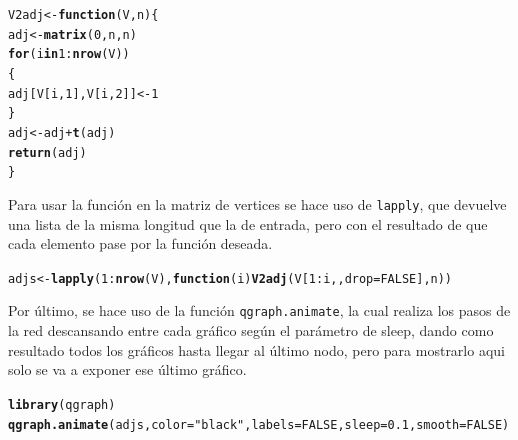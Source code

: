 \documentclass{article}\usepackage[]{graphicx}\usepackage[]{color}
\makeatletter
\newcommand{\hlnum}[1]{\textcolor[rgb]{0.686,0.059,0.569}{#1}}%
\newcommand{\hlstr}[1]{\textcolor[rgb]{0.192,0.494,0.8}{#1}}%
\newcommand{\hlopt}[1]{\textcolor[rgb]{0,0,0}{#1}}%
\newcommand{\hlstd}[1]{\textcolor[rgb]{0.345,0.345,0.345}{#1}}%
\newcommand{\hlkwa}[1]{\textcolor[rgb]{0.161,0.373,0.58}{\textbf{#1}}}%
\newcommand{\hlkwb}[1]{\textcolor[rgb]{0.69,0.353,0.396}{#1}}%
\newcommand{\hlkwc}[1]{\textcolor[rgb]{0.333,0.667,0.333}{#1}}%
\newcommand{\hlkwd}[1]{\textcolor[rgb]{0.737,0.353,0.396}{\textbf{#1}}}%
\newenvironment{kframe}{%
 \def\at@end@of@kframe{}%
 \ifinner\ifhmode%
  \def\at@end@of@kframe{\end{minipage}}%
  \begin{minipage}{\columnwidth}%
 \fi\fi%
 \def\FrameCommand##1{\hskip\@totalleftmargin \hskip-\fboxsep
 \colorbox{shadecolor}{##1}\hskip-\fboxsep
     \hskip-\linewidth \hskip-\@totalleftmargin \hskip\columnwidth}%
 \MakeFramed {\advance\hsize-\width
   \@totalleftmargin\z@ \linewidth\hsize
   \@setminipage}}%
 {\par\unskip\endMakeFramed%
 \at@end@of@kframe}
\newenvironment{knitrout}{}{} %
\makeatother
\begin{document}
\begin{knitrout}
\color{fgcolor}\begin{kframe}
\begin{alltt}
\hlstd{V2adj} \hlkwb{<-} \hlkwa{function}\hlstd{(}\hlkwc{V}\hlstd{,}\hlkwc{n}\hlstd{)\{}
  \hlstd{adj} \hlkwb{<-} \hlkwd{matrix}\hlstd{(}\hlnum{0}\hlstd{,n,n)}
  \hlkwa{for} \hlstd{(i} \hlkwa{in} \hlnum{1}\hlopt{:}\hlkwd{nrow}\hlstd{(V))}
  \hlstd{\{}
    \hlstd{adj[V[i,}\hlnum{1}\hlstd{],V[i,}\hlnum{2}\hlstd{]]} \hlkwb{<-} \hlnum{1}
  \hlstd{\}}
  \hlstd{adj} \hlkwb{<-} \hlstd{adj} \hlopt{+} \hlkwd{t}\hlstd{(adj)}
  \hlkwd{return}\hlstd{(adj)}
\hlstd{\}}
\end{alltt}
\end{kframe}
\end{knitrout}
Para usar la funci\'on en la matriz de vertices se hace uso de \texttt{lapply}, que devuelve una lista de la misma longitud que la de entrada, pero con el resultado de que cada elemento pase por la funci\'on deseada. 
\begin{knitrout}
\color{fgcolor}\begin{kframe}
\begin{alltt}
\hlstd{adjs} \hlkwb{<-} \hlkwd{lapply}\hlstd{(}\hlnum{1}\hlopt{:}\hlkwd{nrow}\hlstd{(V),}\hlkwa{function}\hlstd{(}\hlkwc{i}\hlstd{)} \hlkwd{V2adj}\hlstd{(V[}\hlnum{1}\hlopt{:}\hlstd{i,,}\hlkwc{drop}\hlstd{=}\hlnum{FALSE}\hlstd{],n))}
\end{alltt}
\end{kframe}
\end{knitrout}
Por \'ultimo, se hace uso de la funci\'on \texttt{qgraph.animate}, la cual realiza los pasos de la red descansando entre cada gr\'afico seg\'un el par\'ametro de sleep, dando como resultado todos los gr\'aficos hasta llegar al \'ultimo nodo, pero para mostrarlo aqui solo se va a exponer ese \'ultimo gr\'afico.
\begin{knitrout}
\color{fgcolor}\begin{kframe}
\begin{alltt}
\hlkwd{library}\hlstd{(qgraph)}
\hlkwd{qgraph.animate}\hlstd{(adjs,}\hlkwc{color}\hlstd{=}\hlstr{"black"}\hlstd{,}\hlkwc{labels}\hlstd{=}\hlnum{FALSE}\hlstd{,}\hlkwc{sleep}\hlstd{=}\hlnum{0.1}\hlstd{,} \hlkwc{smooth} \hlstd{=} \hlnum{FALSE}\hlstd{)}
\end{alltt}
\end{kframe}
\end{knitrout}
\end{document}
